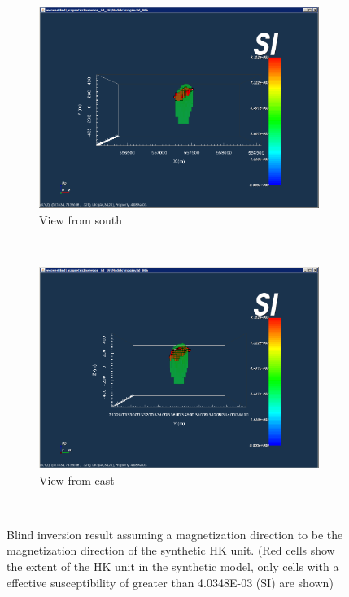 \begin{figure}
    \centering
    \begin{subfigure}[b]{0.5\textwidth}
        \includegraphics[width=\textwidth]{images/TKC/blind53_19South.PNG}
        \caption{View from south}
        \label{fig:blind53_19South}
    \end{subfigure}
    ~ %
    \begin{subfigure}[b]{0.5\textwidth}
        \includegraphics[width=\textwidth]{images/TKC/blind53_19East.PNG}
        \caption{View from east}
        \label{fig:blind53_19East}
    \end{subfigure}
    ~ %
   \caption{Blind inversion result assuming a magnetization direction to be the magnetization direction of the synthetic HK unit. (Red cells show the extent of the HK unit in the synthetic model, only cells with a effective susceptibility of greater than 4.0348E-03 (SI) are shown)}
   \label{fig:blind53_19}
\end{figure}

